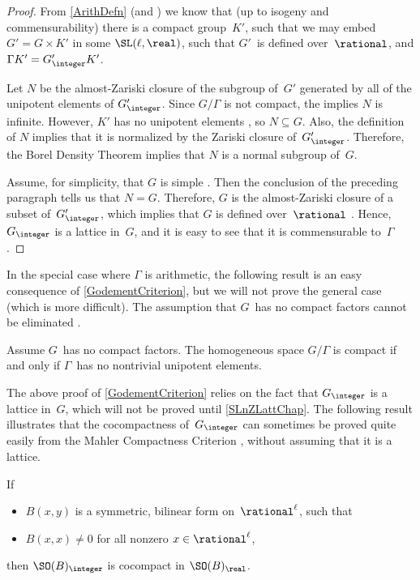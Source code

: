 \begin{proof}
 From \cref{ArithDefn} (and ) we know that (up to isogeny and
commensurability) there is a compact group~$K'$, such that we
may embed $G' = G \times K'$ in some $\SL(\ell,\real)$, such
that $G'$~is defined over~$\rational$, and $\Gamma K' =
G'_{\integer} K'$.

Let $N$ be the almost-Zariski closure of the subgroup
of~$G'$ generated by all of the unipotent elements of
$G'_{\integer}$. 
Since $G/\Gamma$ is not compact, the  %
implies $N$ is infinite.
However, $K'$ has no unipotent elements , so $N \subseteq G$. 
Also, the definition of $N$ implies that it is normalized by the Zariski closure of~$G'_{\integer}$.
Therefore, the Borel Density Theorem  implies that $N$
is a normal subgroup of~$G$. 

Assume, for simplicity, that $G$ is simple . Then the conclusion of the preceding paragraph tells us that $N = G$.  
Therefore, $G$ is the almost-Zariski closure of a subset
of~$G'_{\integer}$, which
implies that $G$ is defined over~$\rational$
. Hence, $G_{\integer}$ is a lattice
in~$G$, and it is easy to see that it is commensurable to~$\Gamma$ .
 \end{proof}

In the special case where $\Gamma$ is arithmetic, the following
result is an easy consequence of \cref{GodementCriterion}, but we will not prove the general case (which is more difficult). The
assumption that $G$~has no compact factors cannot be
eliminated .

\begin{thm} \label{GodementNoCpctFactor}
 Assume $G$~has no
compact factors. The homogeneous space $G/\Gamma$
is compact if and only if\/ $\Gamma$~has no nontrivial
unipotent elements.
 \end{thm}

The above proof of \cref{GodementCriterion} relies on
the fact that $G_{\integer}$ is a lattice in~$G$, which
will not be proved until \cref{SLnZLattChap}. The following result illustrates that
the cocompactness of~$G_\integer$ can sometimes be proved quite
easily from the Mahler Compactness Criterion
, without assuming that it is a lattice.

\begin{prop} \label{anis->cocpct}
 If 
 \noprelistbreak
 	\begin{itemize}
	\item $B(x,y)$ is a symmetric, bilinear form on\/~$\rational^\ell$, 
	such that
	\item  $B(x,x) \neq 0$ for all nonzero $x \in \rational^\ell$,
	\end{itemize}
then\/ $\SO(B)_{\integer}$
is cocompact in $\SO(B)_{\real}$.
 \end{prop}

